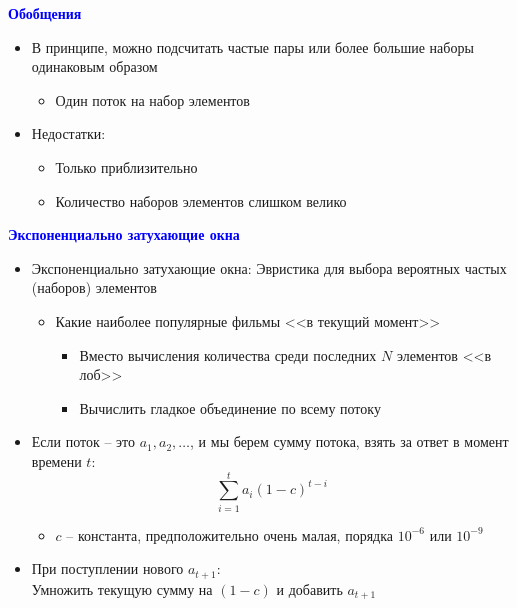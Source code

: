\documentclass[landscape]{slides}
\begin{document}
\begin{normalsize}
\begin{slide}
\textbf{\textcolor{blue}{Обобщения}}

\begin{itemize}
\item В принципе, можно подсчитать частые пары или более большие наборы одинаковым образом
  \begin{itemize}
  \item Один поток на набор элементов
  \end{itemize}
\item Недостатки:
  \begin{itemize}
  \item Только приблизительно
  \item Количество наборов элементов слишком велико
  \end{itemize}
\end{itemize}
\end{slide}


\begin{slide}
\textbf{\textcolor{blue}{Экспоненциально затухающие окна}}

\begin{itemize}
\item Экспоненциально затухающие окна: Эвристика для выбора вероятных частых (наборов) элементов
  \begin{itemize}
  \item Какие наиболее популярные фильмы <<в текущий момент>>
    \begin{itemize}
    \item Вместо вычисления количества среди последних $N$ элементов <<в лоб>>
    \item Вычислить гладкое объединение по всему потоку
    \end{itemize}
  \end{itemize}
\item Если поток -- это $a_1,a_2,\ldots$, и мы берем сумму потока, взять за ответ в момент времени $t$:
$$ \sum_{i=1}^t a_i(1-c)^{t-i} $$
  \begin{itemize}
  \item $c$ -- константа, предположительно очень малая, порядка $10^{-6}$ или $10^{-9}$
  \end{itemize}
\item При поступлении нового $a_{t+1}$:\\
Умножить текущую сумму на $(1-c)$ и добавить $a_{t+1}$
\end{itemize}
\end{slide}



\end{normalsize}
\end{document}
